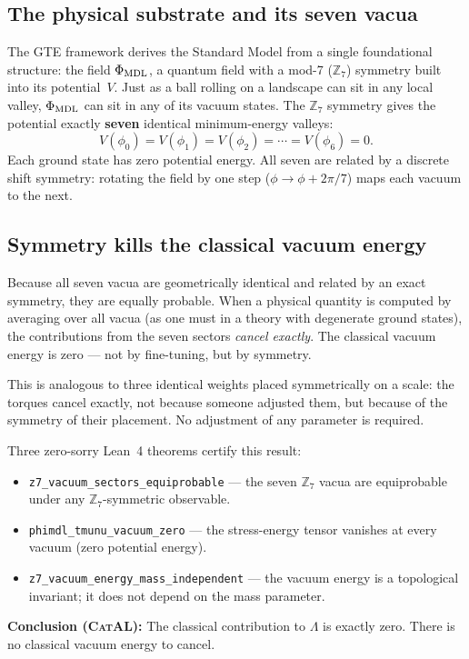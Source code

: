 \documentclass[11pt,a4paper]{article}
\newcommand{\lean}[1]{\texttt{#1}}
\newcommand{\ZS}{\mathbb{Z}_7}
\newcommand{\PHIMDL}{\Phi_{\rm MDL}}
\newcommand{\CatAL}{\textsc{CatAL}}
\begin{document}
\subsection{The physical substrate and its seven vacua}

The GTE framework derives the Standard Model from a single foundational
structure: the field $\PHIMDL$, a quantum field with a mod-7 ($\ZS$) symmetry
built into its potential~$V$.  Just as a ball rolling on a landscape can sit in
any local valley, $\PHIMDL$ can sit in any of its vacuum states.  The $\ZS$
symmetry gives the potential exactly \textbf{seven} identical minimum-energy
valleys:
\[
  V(\phi_0) = V(\phi_1) = V(\phi_2) = \cdots = V(\phi_6) = 0.
\]
Each ground state has zero potential energy.  All seven are related by a discrete
shift symmetry: rotating the field by one step ($\phi \to \phi + 2\pi/7$)
maps each vacuum to the next.

\subsection{Symmetry kills the classical vacuum energy}

Because all seven vacua are geometrically identical and related by an exact
symmetry, they are equally probable.  When a physical quantity is computed by
averaging over all vacua (as one must in a theory with degenerate ground
states), the contributions from the seven sectors \emph{cancel exactly}.
The classical vacuum energy is zero --- not by fine-tuning, but by symmetry.

This is analogous to three identical weights placed symmetrically on a scale:
the torques cancel exactly, not because someone adjusted them, but because of
the symmetry of their placement.  No adjustment of any parameter is required.

\begin{tcolorbox}[colback=boxgreen,colframe=green!50!black,
  title={The Lean-certified chain (\CatAL)}]
Three zero-sorry Lean~4 theorems certify this result:
\begin{itemize}[itemsep=2pt]
  \item \lean{z7\_vacuum\_sectors\_equiprobable} --- the seven $\ZS$ vacua
    are equiprobable under any $\ZS$-symmetric observable.
  \item \lean{phimdl\_tmunu\_vacuum\_zero} --- the stress-energy tensor
    vanishes at every vacuum (zero potential energy).
  \item \lean{z7\_vacuum\_energy\_mass\_independent} --- the vacuum energy
    is a topological invariant; it does not depend on the mass parameter.
\end{itemize}
\textbf{Conclusion (\CatAL):} The classical contribution to $\Lambda$ is exactly
zero.  There is no classical vacuum energy to cancel.
\end{tcolorbox}
\end{document}
